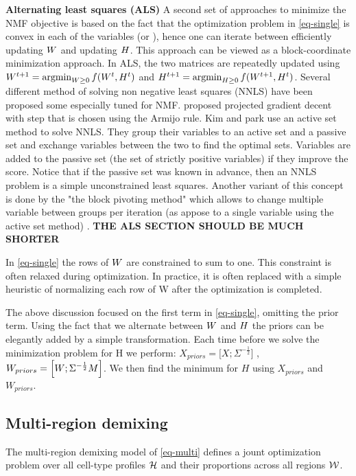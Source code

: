 {\bf{Alternating least squares} (ALS)} A second set of approaches to minimize the NMF objective is based on the fact that the optimization problem in \eqref{eq-single} is convex in each of the variables \W (or \Htext), hence one can iterate between efficiently updating $W$ and updating ${H}$. This approach can be viewed as a block-coordinate minimization approach. In ALS, the two matrices are  repeatedly updated using $ W^{t+1} = \argmin_{W \geq 0 } f(W^t, H^t)$ and $H^{t+1} = \argmin_{H \geq 0 } f(W^{t+1},H^t)$. Several different method of solving non negative least squares (NNLS) have been proposed some especially tuned for NMF. \citet{lin2007projected} proposed projected gradient decent with step that is chosen using the Armijo rule. 
Kim and park \cite{kim2008activeset,kim2011fast} use an active set method to solve NNLS. They group their variables to an active set and a passive set and 
exchange variables between the two to find the optimal sets. Variables are added to the passive set (the set of strictly positive variables) if they improve the score. Notice that if the passive set was known in advance, then an NNLS problem is a simple unconstrained least squares. Another variant of this concept is done by the "the block pivoting method" which allows to change multiple variable between groups per iteration (as appose to a single variable using the active set method) \cite{kim2011fast}. {\bf{THE ALS SECTION SHOULD BE MUCH SHORTER}}

In \eqref{eq-single} the rows of $W$ are constrained to sum to one. This constraint is often relaxed during optimization. In practice, it is often replaced with a simple heuristic of normalizing each row of W after the optimization is completed. 

The above discussion focused on the first term in \eqref{eq-single}, omitting the prior term. Using the fact that we alternate between $W$ and ${H}$ the priors can be elegantly added by a simple transformation. Each time before we solve the minimization problem for H we perform:
$ X_{priors} = \Big[ X ;\Sigma^{-\frac{1}{2}} \Big]  $  ,  $ W_{priors} = \Big[  W ; \Sigma^{-\frac{1}{2}} M \Big]  $. We then find the minimum for $H$ using $X_{priors} $ and $W_{priors} $. 



\subsection{Multi-region demixing}
The multi-region demixing model of \eqref{eq-multi} defines a jount optimization problem over all cell-type profiles $\cal{{H}}$ and their proportions across all regions $\cal{W}$.

